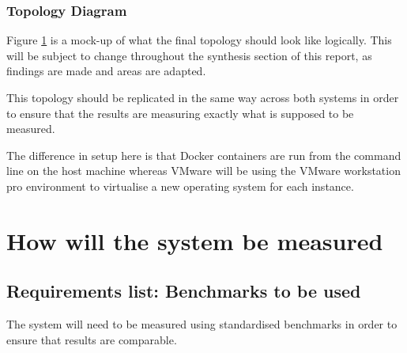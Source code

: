 \subsection{Topology Diagram}
\label{subsec:TopologyDiagram}
Figure \ref{fig:Topology} is a mock-up of what the final topology should look like logically. This will be subject to change throughout the synthesis section of this report, as findings are made and areas are adapted.
\begin{figure}[H]
\caption{}
\label{fig:Topology}
\centering
\end{figure}

This topology should be replicated in the same way across both systems in order to ensure that the results are measuring exactly what is supposed to be measured.

The difference in setup here is that Docker containers are run from the command line on the host machine whereas VMware will be using the VMware workstation pro environment to virtualise a new operating system for each instance. 

\chapter{How will the system be measured}

\section{Requirements list: Benchmarks to be used}
\label{RequirementsListBench}
The system will need to be measured using standardised benchmarks in order to ensure that results are comparable.

